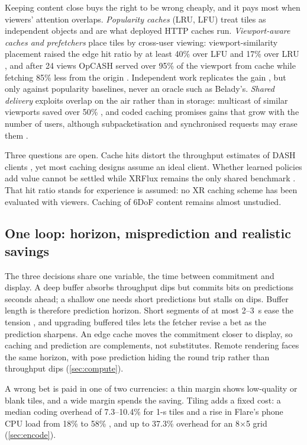 Keeping content close buys the right to be wrong cheaply, and it pays most when viewers' attention overlaps. \emph{Popularity caches} (LRU, LFU) treat tiles as independent objects and are what deployed HTTP caches run. \emph{Viewport-aware caches and prefetchers} place tiles by cross-user viewing: viewport-similarity placement raised the edge hit ratio by at least 40\% over LFU and 17\% over LRU \cite{W2896595273}, and after 24 views OpCASH served over 95\% of the viewport from cache while fetching 85\% less from the origin \cite{W4288370107}. Independent work replicates the gain \cite{W3021782077}, but only against popularity baselines, never an oracle such as Belady's. \emph{Shared delivery} exploits overlap on the air rather than in storage: multicast of similar viewports saved over 50\% \cite{W2725312916}, and coded caching promises gains that grow with the number of users, although subpacketisation and synchronised requests may erase them \cite{W4381251523}.

Three questions are open. Cache hits distort the throughput estimates of DASH clients \cite{W3122351391}, yet most caching designs assume an ideal client. Whether learned policies add value cannot be settled while XRFlux remains the only shared benchmark \cite{W4409763640}. That hit ratio stands for experience is assumed: no XR caching scheme has been evaluated with viewers. Caching of 6DoF content remains almost unstudied.

\subsection{One loop: horizon, misprediction and realistic savings}

The three decisions share one variable, the time between commitment and display. A deep buffer absorbs throughput dips but commits bits on predictions seconds ahead; a shallow one needs short predictions but stalls on dips. Buffer length is therefore prediction horizon. Short segments of at most 2--3~s ease the tension \cite{W2527384707}, and upgrading buffered tiles lets the fetcher revise a bet as the prediction sharpens. An edge cache moves the commitment closer to display, so caching and prediction are complements, not substitutes. Remote rendering faces the same horizon, with pose prediction hiding the round trip rather than throughput dips (\cref{sec:compute}).

A wrong bet is paid in one of two currencies: a thin margin shows low-quality or blank tiles, and a wide margin spends the saving. Tiling adds a fixed cost: a median coding overhead of 7.3--10.4\% for 1-s tiles and a rise in Flare's phone CPU load from 18\% to 58\% \cite{W2896840651}, and up to 37.3\% overhead for an 8$\times$5 grid \cite{W2623784065} (\cref{sec:encode}).

